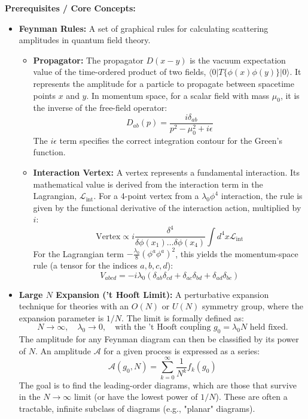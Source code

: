 \begin{solution}
\textbf{Prerequisites / Core Concepts:}
\begin{itemize}
    \item \textbf{Feynman Rules:} A set of graphical rules for calculating scattering amplitudes in quantum field theory.
    \begin{itemize}
        \item \textbf{Propagator:} The propagator $D(x-y)$ is the vacuum expectation value of the time-ordered product of two fields, $\langle 0 | T\{\phi(x)\phi(y)\} | 0 \rangle$. It represents the amplitude for a particle to propagate between spacetime points $x$ and $y$. In momentum space, for a scalar field with mass $\mu_0$, it is the inverse of the free-field operator:
        \[ D_{ab}(p) = \frac{i \delta_{ab}}{p^2 - \mu_0^2 + i\epsilon} \]
        The $i\epsilon$ term specifies the correct integration contour for the Green's function.
        \item \textbf{Interaction Vertex:} A vertex represents a fundamental interaction. Its mathematical value is derived from the interaction term in the Lagrangian, $\mathcal{L}_{\text{int}}$. For a 4-point vertex from a $\lambda_0\phi^4$ interaction, the rule is given by the functional derivative of the interaction action, multiplied by $i$:
        \[ \text{Vertex} \propto i \frac{\delta^4}{\delta\phi(x_1)\dots\delta\phi(x_4)} \int d^4x \mathcal{L}_{\text{int}} \]
        For the Lagrangian term $-\frac{\lambda_0}{8}(\phi^a\phi^a)^2$, this yields the momentum-space rule (a tensor for the indices $a,b,c,d$):
        \[ V_{abcd} = -i \lambda_0 (\delta_{ab}\delta_{cd} + \delta_{ac}\delta_{bd} + \delta_{ad}\delta_{bc}) \]
    \end{itemize}
    \item \textbf{Large $N$ Expansion ('t Hooft Limit):} A perturbative expansion technique for theories with an $O(N)$ or $U(N)$ symmetry group, where the expansion parameter is $1/N$. The limit is formally defined as:
    \[ N \to \infty, \quad \lambda_0 \to 0, \quad \text{with the 't Hooft coupling } g_0 = \lambda_0 N \text{ held fixed.} \]
    The amplitude for any Feynman diagram can then be classified by its power of $N$. An amplitude $\mathcal{A}$ for a given process is expressed as a series:
    \[ \mathcal{A}(g_0, N) = \sum_{k=0}^\infty \frac{1}{N^k} f_k(g_0) \]
    The goal is to find the leading-order diagrams, which are those that survive in the $N\to\infty$ limit (or have the lowest power of $1/N$). These are often a tractable, infinite subclass of diagrams (e.g., "planar" diagrams).
\end{itemize}


\end{solution}
